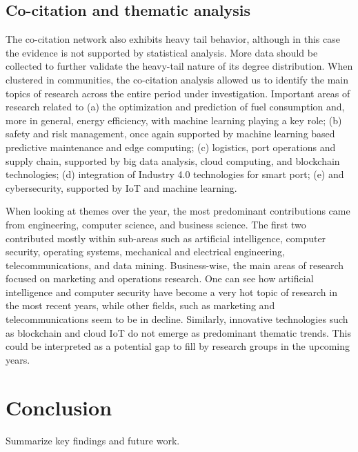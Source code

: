 \documentclass[a4paper, review, endfloat, authoryear]{elsarticle}
\begin{document}
	\subsection{Co-citation and thematic analysis}
	The co-citation network also exhibits heavy tail behavior, although in this case the evidence is not supported by statistical analysis. More data should be collected to further validate the heavy-tail nature of its degree distribution. When clustered in communities, the co-citation analysis allowed us to identify the main topics of research across the entire period under investigation. Important areas of research related to (a) the optimization and prediction of fuel consumption and, more in general, energy efficiency, with machine learning playing a key role; (b) safety and risk management, once again supported by machine learning based predictive maintenance and edge computing; (c) logistics, port operations and supply chain, supported by big data analysis, cloud computing, and blockchain technologies; (d) integration of Industry 4.0 technologies for smart port; (e) and cybersecurity, supported by IoT and machine learning.
	
	When looking at themes over the year, the most predominant contributions came from engineering, computer science, and business science. The first two contributed mostly within sub-areas such as artificial intelligence, computer security, operating systems, mechanical and electrical engineering, telecommunications, and data mining. Business-wise, the main areas of research focused on marketing and operations research. One can see how artificial intelligence and computer security have become a very hot topic of research in the most recent years, while other fields, such as marketing and telecommunications seem to be in decline. Similarly, innovative technologies such as blockchain and cloud IoT do not emerge as predominant thematic trends. This could be interpreted as a potential gap to fill by research groups in the upcoming years.
	
	\section{Conclusion}
	Summarize key findings and future work.
	
	
	
	
\end{document}
